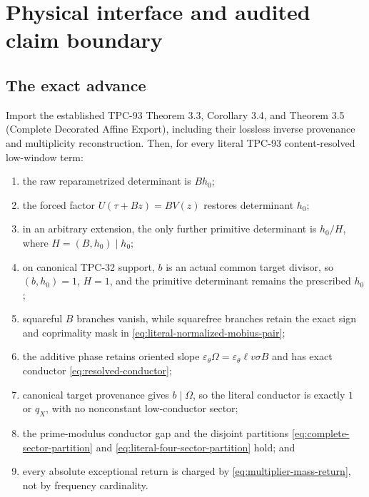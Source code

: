 \section{Physical interface and audited claim boundary}
\label{sec:claim-boundary}

\subsection{The exact advance}

\begin{theorem}
\label{thm:audited-content-resonance-ledger}
Import the established TPC-93 Theorem 3.3, Corollary 3.4, and
Theorem 3.5 (Complete Decorated Affine Export), including their
lossless inverse provenance and multiplicity reconstruction.  Then,
for every literal TPC-93 content-resolved low-window term:
\begin{enumerate}[label=(\roman*),leftmargin=2.2em]
\item the raw reparametrized determinant is \(Bh_0\);
\item the forced factor \(U(\tau+Bz)=BV(z)\) restores determinant
  \(h_0\);
\item in an arbitrary extension, the only further primitive
  determinant is \(h_0/H\), where \(H=(B,h_0)\mid h_0\);
\item on canonical TPC-32 support, \(b\) is an actual common target
  divisor, so \((b,h_0)=1\), \(H=1\), and the primitive determinant
  remains the prescribed \(h_0\);
\item squareful \(B\) branches vanish, while squarefree branches
  retain the exact sign and coprimality mask in
  \eqref{eq:literal-normalized-mobius-pair};
\item the additive phase retains oriented slope
  \(\varepsilon_\theta\Omega
  =\varepsilon_\theta\ell v\sigma B\) and has exact conductor
  \eqref{eq:resolved-conductor};
\item canonical target provenance gives \(b\mid\Omega\), so the
  literal conductor is exactly \(1\) or \(q_X\), with no
  nonconstant low-conductor sector;
\item the prime-modulus conductor gap and the disjoint partitions
  \eqref{eq:complete-sector-partition} and
  \eqref{eq:literal-four-sector-partition} hold; and
\item every absolute exceptional return is charged by
  \eqref{eq:multiplier-mass-return}, not by frequency cardinality.
\end{enumerate}
\end{theorem}

